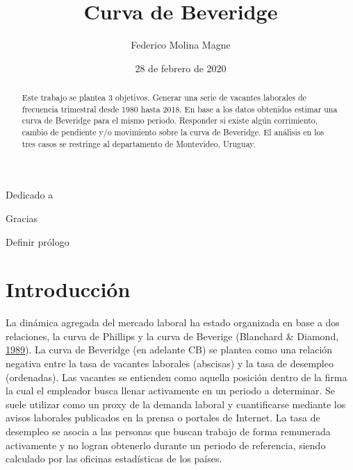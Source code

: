 \documentclass[12pt,oneside]{reedthesis}
\title{Curva de Beveridge}
\author{Federico Molina Magne}
\date{28 de febrero de 2020}
\begin{document}
  \maketitle



\frontmatter %
\pagestyle{empty} %
  \begin{dedication}
    Dedicado a
  \end{dedication}
  \begin{acknowledgements}
    Gracias
  \end{acknowledgements}
  \begin{abstract}
    Este trabajo se plantea 3 objetivos. Generar una serie de vacantes laborales de frecuencia trimestral desde 1980 hasta 2018. En base a los datos obtenidos estimar una curva de Beveridge para el mismo periodo. Responder si existe algún corrimiento, cambio de pendiente y/o movimiento sobre la curva de Beveridge. El análisis en los tres casos se restringe al departamento de Montevideo, Uruguay.
  \end{abstract}
  \begin{preface}
    Definir prólogo
  \end{preface}
  \hypersetup{linkcolor=black}
  \setcounter{tocdepth}{2}
  \tableofcontents

  \listoftables

  \listoffigures

\mainmatter %
\pagestyle{fancyplain} %

\hypertarget{intro}{%
\chapter{Introducción}\label{intro}}

La dinámica agregada del mercado laboral ha estado organizada en base a dos relaciones, la curva de Phillips y la curva de Beverige (Blanchard \& Diamond, \protect\hyperlink{ref-Blanchard1989}{1989}). La curva de Beveridge (en adelante CB) se plantea como una relación negativa entre la tasa de vacantes laborales (abscisas) y la tasa de desempleo (ordenadas). Las vacantes se entienden como aquella posición dentro de la firma la cual el empleador busca llenar activamente en un periodo a determinar. Se suele utilizar como un proxy de la demanda laboral y cuantificarse mediante los avisos laborales publicados en la prensa o portales de Internet. La tasa de desempleo se asocia a las personas que buscan trabajo de forma remunerada activamente y no logran obtenerlo durante un periodo de referencia, siendo calculado por las oficinas estadísticas de los países.
\end{document}
